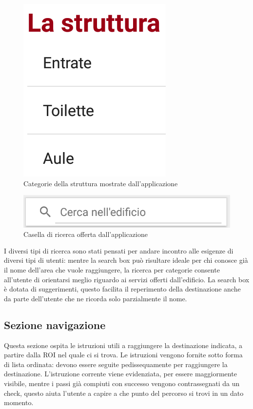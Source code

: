 \documentclass[../Sperimentazione.tex]{subfiles}
\begin{document}
			\begin{figure} [h]
				\centering
				\includegraphics[scale=0.25]{img/list_poi_category}
				\caption{Categorie della struttura mostrate dall'applicazione}
				\label{fig:ListPoiCategory}
			\end{figure}
			
			\begin{figure} [h]
				\centering
				\includegraphics[scale=0.25]{img/searchbox}
				\caption{Casella di ricerca offerta dall'applicazione}
				\label{fig:SearchBox}
			\end{figure}
		
		I diversi tipi di ricerca sono stati pensati per andare incontro alle esigenze di diversi tipi di utenti: mentre la search box può risultare ideale per chi conosce già il nome dell'area che vuole raggiungere, la ricerca per categorie consente all'utente di orientarsi meglio riguardo ai servizi offerti dall'edificio. 
		La search box è dotata di suggerimenti, questo facilita il reperimento della destinazione anche da parte dell'utente che ne ricorda solo parzialmente il nome.

		\subsection{Sezione navigazione}
			Questa sezione ospita le istruzioni utili a raggiungere la destinazione indicata, a partire dalla ROI nel quale ci si trova.
			Le istruzioni vengono fornite sotto forma di lista ordinata: devono essere seguite pedissequamente per raggiungere la destinazione.
			L'istruzione corrente viene evidenziata, per essere maggiormente visibile, mentre i passi già compiuti con successo vengono contrassegnati da un check, questo aiuta l'utente a capire a che punto del percorso si trovi in un dato momento.
\end{document}
